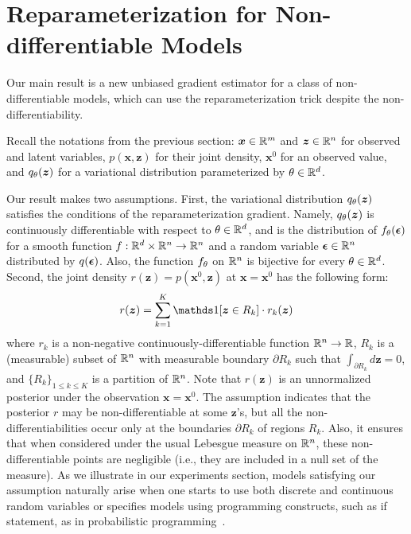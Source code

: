
\section{Reparameterization for Non-differentiable Models}
\label{sec:result}

Our main result is a new unbiased gradient estimator for a class of non-differentiable models, which can use the reparameterization trick despite the non-differentiability. 

Recall the notations from the previous section: $\bm{x} \in \mathbb{R}^m$ and $\bm{z}\in \mathbb{R}^n$ for observed and latent variables, $p(\bm{x},\bm{z})$ for their joint density, $\bm{x}^0$ for an observed value, and $q_\theta(\bm{z})$ for a variational distribution parameterized by $\theta \in \mathbb{R}^d$.

Our result makes two assumptions. First, the variational distribution $q_\theta(\bm{z})$ satisfies the conditions of the reparameterization gradient. Namely, $q_\theta(\bm{z})$ is continuously differentiable with respect to $\theta \in \mathbb{R}^d$, and is the distribution of $f_\theta(\bm{\epsilon})$ for a smooth function $f : \mathbb{R}^d \times \mathbb{R}^n \to \mathbb{R}^n$ and a random variable $\bm{\epsilon} \in \mathbb{R}^n$ distributed by $q(\bm{\epsilon})$. Also, the function $f_\theta$ on $\mathbb{R}^n$ is bijective for every $\theta \in \mathbb{R}^d$. Second, the joint density $r(\bm{z}) = p(\bm{x}^0,\bm{z})$ at $\bm{x} = \bm{x}^0$ has the following form:
\begin{equation}
\label{eqn:nondiff-density}
r(\bm{z}) = \sum_{k = 1}^K \indc{\bm{z} \in R_k} \cdot r_k(\bm{z})
\end{equation}
where $r_k$ is a non-negative continuously-differentiable function $\mathbb{R}^n \to \mathbb{R}$, 
$R_k$ is a (measurable) subset of $\mathbb{R}^n$ with measurable boundary $\partial R_k$ such that $\int_{\partial R_k} d\bm{z} = 0$, and $\{R_k\}_{1 \leq k \leq K}$ is a partition of $\mathbb{R}^n$.
Note that $r(\bm{z})$ is an unnormalized posterior under the observation $\bm{x} = \bm{x}^0$. The assumption indicates that the posterior $r$ may be non-differentiable at some $\bm{z}$'s, but all the non-differentiabilities occur only at the boundaries $\partial R_k$ of regions $R_k$. Also, it ensures that when considered under the usual Lebesgue measure on $\mathbb{R}^n$, these non-differentiable points are negligible (i.e., they are included in a null set of the measure). As we illustrate in our experiments section, models satisfying our assumption naturally arise when one starts to use both discrete and continuous random variables or specifies models using programming constructs, such as if statement, as in probabilistic programming~\cite{GoodmanUAI08,Veture14,WoodAISTATS14,GordonICSE14}.


